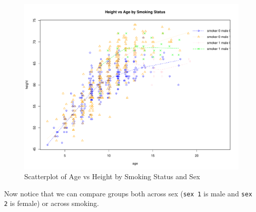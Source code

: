 \documentclass[landscape]{article}
\begin{document}
\begin{figure}[h]
\centering
\includegraphics[scale=.005]{fevdoc-smokesexcatter}
\caption{Scatterplot of Age vs Height by Smoking Status and Sex}
\label{smokesexcatter}
\end{figure}
Now notice that we can compare groups both across sex (\texttt{sex 1} is male and \texttt{sex 2} is female) or across smoking. 
\clearpage
\end{document}
